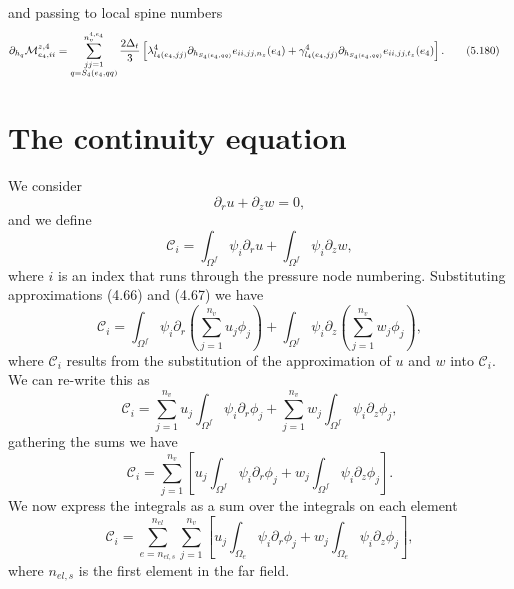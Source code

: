\documentclass{article}
\begin{document}
and passing to local spine numbers
\begin{align}
\partial_{h_q}\mathcal{M}_{e_4,ii}^{z,4} &= \sum_{\substack{jj=1\\ q=S_4(e_4,qq)}}^{n_v^{4,e_4}} \frac{2\Delta_t}{3} \left[ \lambda_{l_4(e_4,jj)}^4 \partial_{h_{S_4(e_4,qq)}} e_{ii,jj,n_z}(e_4) + \gamma_{l_4(e_4,jj)}^4 \partial_{h_{S_4(e_4,qq)}} e_{ii,jj,t_z}(e_4) \right]. \tag{5.180}
\end{align}

\section{The continuity equation} %
We consider
\begin{equation}
\partial_r u + \partial_z w = 0, \tag{6.1}
\end{equation}
and we define
\begin{equation}
\mathcal{C}_i = \int_{\Omega^f} \psi_i \partial_r u + \int_{\Omega^f} \psi_i \partial_z w, \tag{6.2}
\end{equation}
where $i$ is an index that runs through the pressure node numbering. Substituting approximations (4.66) and (4.67) we have
\begin{equation}
\mathcal{C}_i = \int_{\Omega^f} \psi_i \partial_r \left( \sum_{j=1}^{n_v} u_j \phi_j \right) + \int_{\Omega^f} \psi_i \partial_z \left( \sum_{j=1}^{n_v} w_j \phi_j \right), \tag{6.3}
\end{equation}
where $\mathcal{C}_i$ results from the substitution of the approximation of $u$ and $w$ into $\mathcal{C}_i$.
We can re-write this as
\begin{equation}
\mathcal{C}_i = \sum_{j=1}^{n_v} u_j \int_{\Omega^f} \psi_i \partial_r \phi_j + \sum_{j=1}^{n_v} w_j \int_{\Omega^f} \psi_i \partial_z \phi_j, \tag{6.4}
\end{equation}
gathering the sums we have
\begin{equation}
\mathcal{C}_i = \sum_{j=1}^{n_v} \left[ u_j \int_{\Omega^f} \psi_i \partial_r \phi_j + w_j \int_{\Omega^f} \psi_i \partial_z \phi_j \right]. \tag{6.5}
\end{equation}
We now express the integrals as a sum over the integrals on each element
\begin{equation}
\mathcal{C}_i = \sum_{e=n_{el,s}}^{n_{el}} \sum_{j=1}^{n_v} \left[ u_j \int_{\Omega_e} \psi_i \partial_r \phi_j + w_j \int_{\Omega_e} \psi_i \partial_z \phi_j \right], \tag{6.6}
\end{equation}
where $n_{el,s}$ is the first element in the far field.
\end{document}
